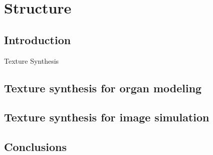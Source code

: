 \chapter{Structure}
\label{chapter:textureSynthesis}

\section{Introduction}
\label{s:p1-1-intro}
Texture Synthesis


\section{Texture synthesis for organ modeling}
\label{section:textureOrgan}



\section{Texture synthesis for image simulation}
\label{section:textureSimulation}


\section{Conclusions}
\label{section:textureConclusions}


\newpage

